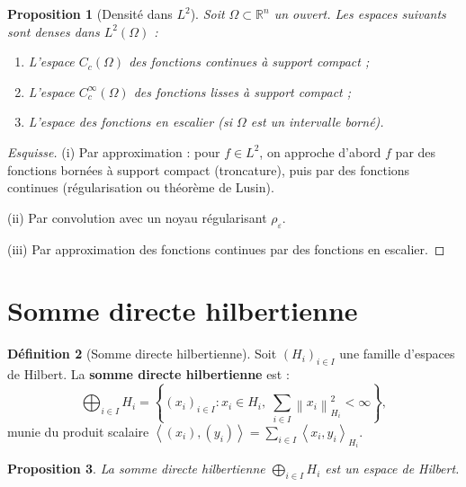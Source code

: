 \documentclass[a4paper,12pt]{book}
\newcommand{\R}{\mathbb{R}}
\newcommand{\norm}[1]{\left\| #1 \right\|}
\newcommand{\inner}[2]{\left\langle #1, #2 \right\rangle}
\theoremstyle{definition}
\newtheorem{definition}{Définition}[chapter]
\theoremstyle{plain}
\newtheorem{proposition}[definition]{Proposition}
\theoremstyle{remark}
\begin{document}
\begin{proposition}[Densité dans $L^2$]\label{prop:densite-L2}
Soit $\Omega \subset \R^n$ un ouvert. Les espaces suivants sont denses dans $L^2(\Omega)$ :
\begin{enumerate}[label=(\roman*)]
    \item L'espace $C_c(\Omega)$ des fonctions continues à support compact ;
    \item L'espace $C_c^\infty(\Omega)$ des fonctions lisses à support compact ;
    \item L'espace des fonctions en escalier (si $\Omega$ est un intervalle borné).
\end{enumerate}
\end{proposition}

\begin{proof}[Esquisse]
(i) Par approximation : pour $f \in L^2$, on approche d'abord $f$ par des fonctions bornées à support compact (troncature), puis par des fonctions continues (régularisation ou théorème de Lusin).

(ii) Par convolution avec un noyau régularisant $\rho_\varepsilon$.

(iii) Par approximation des fonctions continues par des fonctions en escalier.
\end{proof}

\section{Somme directe hilbertienne}

\begin{definition}[Somme directe hilbertienne]\label{def:somme-directe-hilbertienne}
Soit $(H_i)_{i \in I}$ une famille d'espaces de Hilbert. La \textbf{somme directe hilbertienne} est :
\[
    \bigoplus_{i \in I} H_i = \left\{ (x_i)_{i \in I} : x_i \in H_i, \; \sum_{i \in I} \norm{x_i}_{H_i}^2 < \infty \right\},
\]
munie du produit scalaire $\inner{(x_i)}{(y_i)} = \sum_{i \in I} \inner{x_i}{y_i}_{H_i}$.
\end{definition}

\begin{proposition}\label{prop:somme-directe-hilbert}
La somme directe hilbertienne $\bigoplus_{i \in I} H_i$ est un espace de Hilbert.
\end{proposition}
\end{document}
